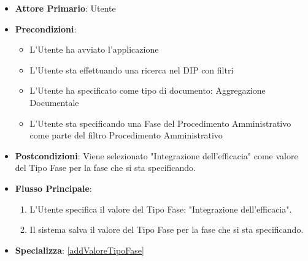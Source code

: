 \begin{itemize}
      \item \textbf{Attore Primario}: Utente
      \item \textbf{Precondizioni}: 
      \begin{itemize}
            \item L'Utente ha avviato l'applicazione
            \item L'Utente sta effettuando una ricerca nel DIP con filtri
            \item L'Utente ha specificato come tipo di documento: Aggregazione Documentale
            \item L'Utente sta specificando una Fase del Procedimento Amministrativo come parte del filtro Procedimento Amministrativo
      \end{itemize}
      \item \textbf{Postcondizioni}: Viene selezionato "Integrazione dell'efficacia" come valore del Tipo Fase per la fase che si sta specificando.
      \item \textbf{Flusso Principale}:
      \begin{enumerate}
            \item L'Utente specifica il valore del Tipo Fase: "Integrazione dell'efficacia".
            \item Il sistema salva il valore del Tipo Fase per la fase che si sta specificando.
      \end{enumerate}
      \item \textbf{Specializza}: \ref{addValoreTipoFase}
\end{itemize}

